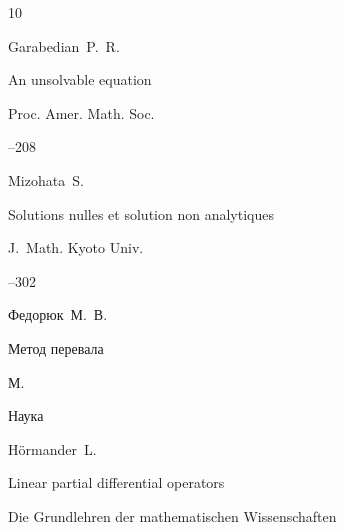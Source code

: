 \begin{thebibliography}{10}













\by Garabedian~P.~R.

\paper  An unsolvable equation

\jour Proc. Amer. Math. Soc. 




--208





\by Mizohata~S.

\paper  Solutions nulles et solution non analytiques


\jour J.~Math. Kyoto Univ.



--302





\by Федорюк~М.~В.

\book  Метод перевала

\publaddr М.

\publ Наука






\by H\"ormander~L.

\book  Linear partial differential operators


\serial Die Grundlehren der mathematischen Wissenschaften



\end{thebibliography}
